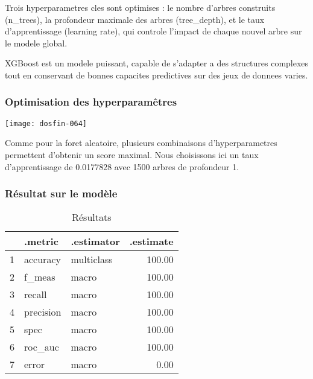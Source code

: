 \documentclass[a4paper,11pt]{article}
\begin{document}
Trois hyperparametres cles sont optimises :  
le nombre d'arbres construits (n\_trees),  
la profondeur maximale des arbres (tree\_depth),  
et le taux d'apprentissage (learning rate), qui controle l'impact de chaque nouvel arbre sur le modele global.

XGBoost est un modele puissant, capable de s'adapter a des structures complexes tout en conservant de bonnes capacites predictives sur des jeux de donnees varies.



\subsubsection{Optimisation des hyperparamêtres}



\begin{center}

\texttt{[image: dosfin-064]}

\end{center}

Comme pour la foret aleatoire, plusieurs combinaisons d'hyperparametres permettent d'obtenir un score maximal. Nous choisissons ici un taux d'apprentissage de 0.0177828 avec 1500 arbres de profondeur 1.


\newpage

\subsubsection{Résultat sur le modèle}

\begin{center}


\begin{table}[ht]
\centering
\begin{tabular}{rllr}
  \hline
 & .metric & .estimator & .estimate \\ 
  \hline
1 & accuracy & multiclass & 100.00 \\ 
  2 & f\_meas & macro & 100.00 \\ 
  3 & recall & macro & 100.00 \\ 
  4 & precision & macro & 100.00 \\ 
  5 & spec & macro & 100.00 \\ 
  6 & roc\_auc & macro & 100.00 \\ 
  7 & error & macro & 0.00 \\ 
   \hline
\end{tabular}
\caption{Résultats} 
\end{table}


\end{center}
\end{document}
